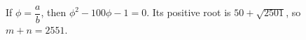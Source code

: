 If $\phi=\dfrac{a}{b}$, then $\phi^2-100\phi-1=0$. Its positive root is $50+\sqrt{2501}$, so $m+n=\boxed{2551}$.
